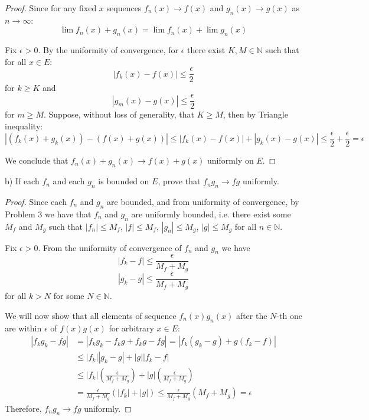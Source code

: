 \documentclass{article}
\newcommand{\N}{\mathbb{N}}
\begin{document}
\begin{proof}

Since for any fixed $x$ sequences $f_n(x) \to f(x)$ and $g_n(x) \to g(x)$ as $n \to \infty$:
\[ \lim f_n(x) + g_n(x) = \lim f_n(x) + \lim g_n(x) \]

Fix $\epsilon>0$.
By the uniformity of convergence, for $\epsilon$ there exist $K, M \in \N$ such that for all $x \in E$:
\[ | f_k(x) - f(x) | \leq \frac{\epsilon}{2} \]
for $k \geq K$ and
\[ | g_m(x) - g(x) | \leq \frac{\epsilon}{2} \]
for $m \geq M$. 
Suppose, without loss of generality, that $K \geq M$, then by Triangle inequality:
\[ | (f_k(x) + g_k(x)) - (f(x) + g(x)) | \leq |f_k(x)-f(x)| + |g_k(x)-g(x)| \leq \frac{\epsilon}{2} + \frac{\epsilon}{2} = \epsilon \]

We conclude that $f_n(x) + g_n(x) \to f(x)+g(x)$ uniformly on $E$.

\end{proof}

\begin{tcolorbox}
b) If each $f_n$ and each $g_n$ is bounded on $E$, prove that $f_n g_n \to f g$ uniformly.
\end{tcolorbox}

\begin{proof}

Since each $f_n$ and $g_n$ are bounded, and from uniformity of convergence, by Problem 3 we have that $f_n$ and $g_n$ are uniformly bounded, i.e. there exist some $M_f$ and $M_g$ such that $|f_n| \leq M_f$, $|f| \leq M_f$, $|g_n| \leq M_g$, $|g| \leq M_g$ for all $n \in \N$.

Fix $\epsilon>0$. From the uniformity of convergence of $f_n$ and $g_n$ we have
\[ |f_k - f| \leq \frac{\epsilon}{M_f + M_g} \]
\[ |g_k - g| \leq \frac{\epsilon}{M_f + M_g} \]
for all $k > N$ for some $N \in \N$.

We will now show that all elements of sequence $f_n(x) g_n(x)$ after the $N$-th one are within $\epsilon$ of $f(x)g(x)$ for arbitrary $x \in E$:
\begin{equation*}
\begin{split}
    |f_k g_k - fg| & = |f_k g_k - f_k g + f_k g - fg| = |f_k(g_k-g) + g(f_k-f)| \\
    & \leq |f_k| |g_k-g| + |g| |f_k-f| \\
    & \leq |f_k| \left( \frac{\epsilon}{M_f + M_g} \right) + |g| \left( \frac{\epsilon}{M_f + M_g} \right) \\
    & = \frac{\epsilon}{M_f + M_g} (|f_k|+|g|) \leq \frac{\epsilon}{M_f + M_g} (M_f+M_g) = \epsilon
\end{split}
\end{equation*}
Therefore, $f_n g_n \to fg$ uniformly.

\end{proof}
\end{document}
